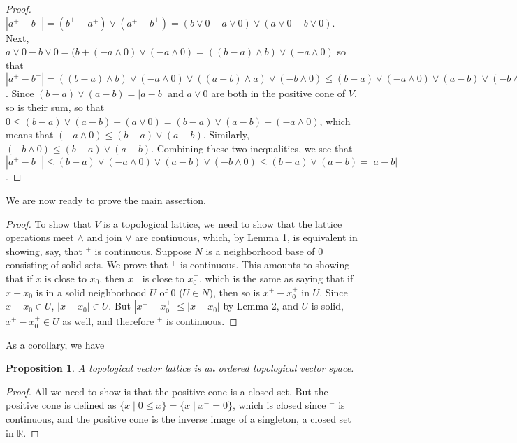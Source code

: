 \documentclass[12pt]{article}
\newtheorem{prop}{Proposition}
\begin{document}
\begin{proof}
$|a^+-b^+|=(b^+-a^+)\vee (a^+-b^+)=(b\vee 0-a\vee 0)\vee(a\vee 0-b\vee 0)$.  Next, $a\vee 0 - b\vee 0 = (b+(-a\wedge 0)\vee (-a\wedge 0)=((b-a)\wedge b)\vee (-a\wedge 0)$ so that $|a^+-b^+|=((b-a)\wedge b)\vee (-a\wedge 0)\vee ((a-b)\wedge a)\vee (-b\wedge 0)\le (b-a)\vee (-a\wedge 0)\vee (a-b)\vee (-b\wedge 0)$.  Since $(b-a)\vee (a-b)=|a-b|$ and $a\vee 0$ are both in the positive cone of $V$, so is their sum, so that $0\le (b-a)\vee (a-b)+(a\vee 0)=(b-a)\vee (a-b)-(-a\wedge 0)$, which means that $(-a\wedge 0)\le (b-a)\vee (a-b)$.  Similarly, $(-b\wedge 0)\le (b-a)\vee (a-b)$.  Combining these two inequalities, we see that $|a^+-b^+|\le (b-a)\vee (-a\wedge 0)\vee (a-b)\vee (-b\wedge 0) \le (b-a)\vee (a-b)=|a-b|$.
\end{proof}

We are now ready to prove the main assertion.
\begin{proof}
To show that $V$ is a topological lattice, we need to show that the lattice operations meet $\wedge$ and join $\vee$ are continuous, which, by Lemma 1, is equivalent in showing, say, that $^+$ is continuous.  Suppose $N$ is a neighborhood base of 0 consisting of solid sets.  We prove that $^+$ is continuous.  This amounts to showing that if $x$ is close to $x_0$, then $x^+$ is close to $x_0^+$, which is the same as saying that if $x-x_0$ is in a solid neighborhood $U$ of $0$ ($U\in N$), then so is $x^+-x_0^+$ in $U$.  Since $x-x_0\in U$, $|x-x_0|\in U$.  But $|x^+-x_0^+|\le |x-x_0|$ by Lemma 2, and $U$ is solid, $x^+-x_0^+\in U$ as well, and therefore $^+$ is continuous.
\end{proof}

As a corollary, we have
\begin{prop}  A topological vector lattice is an ordered topological vector space.  \end{prop}
\begin{proof}  All we need to show is that the positive cone is a closed set.  But the positive cone is defined as $\lbrace x\mid 0\le x\rbrace = \lbrace x\mid x^-=0\rbrace$, which is closed since $^-$ is continuous, and the positive cone is the inverse image of a singleton, a closed set in $\mathbb{R}$.
\end{proof}
\end{document}
